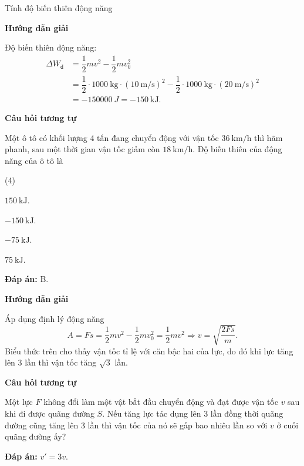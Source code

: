 \begin{dang}{Tính độ biến thiên động năng}
	{	\begin{center}
			\textbf{Hướng dẫn giải}
		\end{center}
		Độ biến thiên động năng:
		\begin{align*}
			\Delta W_\text{đ} &= \dfrac{1}{2}mv^2-\dfrac{1}{2}mv_0^2\\
			&=\dfrac{1}{2}\cdot\SI{1000}{\kilogram}\cdot(\SI{10}{\meter/\second})^2-\dfrac{1}{2}\cdot\SI{1000}{\kilogram}\cdot(\SI{20}{\meter/\second})^2\\
			&= \SI{-150000}{J}=\SI{-150}{\kilo\joule}.
		\end{align*}
		
		
		\begin{center}
			\textbf{Câu hỏi tương tự}
		\end{center}
		
		Một ô tô có khối lượng 4 tấn đang chuyển động với vận tốc $\SI{36}{\kilo\meter/\hour}$ thì hãm phanh, sau một thời gian vận tốc giảm còn $\SI{18}{\kilo\meter/\hour}$. Độ biến thiên của động năng của ô tô là
		\begin{mcq}(4)
			\item $\SI{150}{\kilo\joule}$.
			\item $\SI{-150}{\kilo\joule}$.
			\item $\SI{-75}{\kilo\joule}$.
			\item $\SI{75}{\kilo\joule}$.
		\end{mcq}
		
		\textbf{Đáp án:} B.
	}
	{	\begin{center}
			\textbf{Hướng dẫn giải}
		\end{center}
		
		Áp dụng định lý động năng
		\begin{equation*}
			A=Fs= \dfrac{1}{2}mv^2-\dfrac{1}{2}mv_0^2 = \dfrac{1}{2}mv^2 \Rightarrow v =\sqrt{\dfrac{2  F  s}{m}}.
		\end{equation*}
		Biểu thức trên cho thấy vận tốc tỉ lệ với căn bậc hai của lực, do đó khi lực tăng lên 3 lần thì vận tốc tăng $\sqrt{3}$ lần.
		
		
		\begin{center}
			\textbf{Câu hỏi tương tự}
		\end{center}
		
		Một lực $F$ không đổi làm một vật bắt đầu chuyển động và đạt được vận tốc $v$ sau khi đi được quãng đường $S$. Nếu tăng lực tác dụng lên 3 lần đồng thời quãng đường cũng tăng lên 3 lần thì vận tốc của nó sẽ gấp bao nhiêu lần so với $v$ ở cuối quãng đường ấy?
		
		\textbf{Đáp án:} $v'=3v$.
	}
\end{dang}

